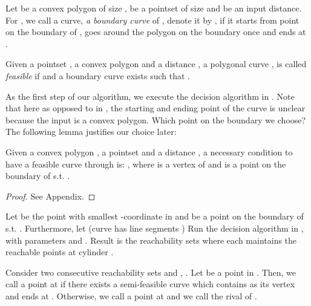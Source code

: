 \documentclass[a4paper,UKenglish]{lipics}
\begin{document}
Let  be a convex polygon of size , 
 be a pointset of size  and  be an input distance. 
For , we call a curve, {\em a boundary curve} of , denote it by ,
if it starts from point  on the boundary of , 
goes around the polygon on the boundary once and ends at 
.



\begin{definition} \label{def:feasible}
Given a pointset , a convex polygon  and a distance ,  
a polygonal curve ,
is called {\em feasible} if 
 and a boundary curve  exists such that 
.
\end{definition}


As the first step of our algorithm, 
we execute the decision algorithm in \cite{cccg11}. 
Note that here as opposed to in \cite{cccg11}, 
the starting and ending point of 
the curve is unclear because the input is a convex polygon.
Which point on the boundary we choose?
The following lemma justifies our choice later:



\begin{lemma} \label{lema:convexhull}
Given a convex polygon , a pointset  and a distance ,
a necessary condition to have a feasible 
curve through  is: 
, 
where  is a vertex of  and  is a point on the boundary of  s.t. .
\end{lemma}




\begin{proof}
See Appendix.
\end{proof}






Let  be the point with 
smallest -coordinate in 
and  be a point on the boundary of 
s.t.   . Furthermore, 
let  (curve  has  line segments
) 
Run the decision algorithm in \cite{cccg11}, 
with parameters  and .
Result is the reachability sets 
 where each  maintains the reachable points at cylinder . 



















\begin{definition}
\label{def:Types}

Consider  two consecutive reachability 
sets   and , .
Let  be a point in . Then, we call 
a  point at  if  there exists a semi-feasible
curve which contains  as its vertex
and ends at .
Otherwise, we call  a  point at  
and we call  the rival of . 
\end{definition}
\end{document}
